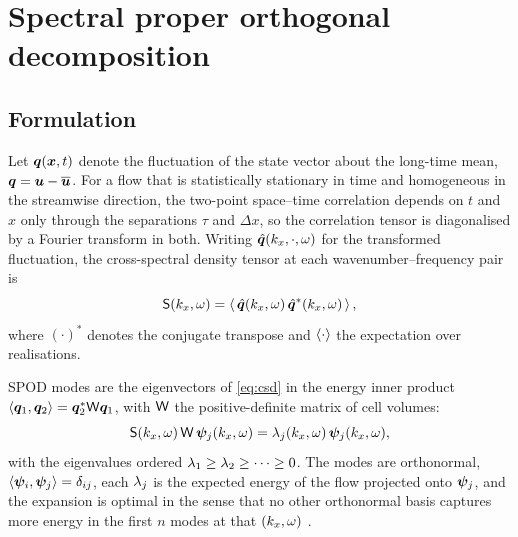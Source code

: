 %
\section{Spectral proper orthogonal decomposition}
\label{sec:spod}

\subsection{Formulation}
\label{sec:spod:formulation}

Let $\bm{q}(\bm{x},t)$ denote the fluctuation of the state vector about the
long-time mean, $\bm{q} = \bm{u} - \overline{\bm{u}}$. For a flow that is
statistically stationary in time and homogeneous in the streamwise direction,
the two-point space--time correlation depends on $t$ and $x$ only through the
separations $\tau$ and $\Delta x$, so the correlation tensor is diagonalised by
a Fourier transform in both. Writing $\hat{\bm{q}}(k_{x},\cdot,\omega)$ for the
transformed fluctuation, the cross-spectral density tensor at each
wavenumber--frequency pair is
\begin{equation}
  \mathsf{S}(k_{x},\omega)
    = \left\langle \, \hat{\bm{q}}(k_{x},\omega)\,\hat{\bm{q}}^{*}(k_{x},\omega) \, \right\rangle ,
  \label{eq:csd}
\end{equation}
where $(\cdot)^{*}$ denotes the conjugate transpose and $\left\langle \cdot \right\rangle$ the
expectation over realisations.

SPOD modes are the eigenvectors of \cref{eq:csd} in the energy inner product
$\left\langle \bm{q}_1 , \bm{q}_2 \right\rangle = \bm{q}_2^{*}\mathsf{W}\bm{q}_1$, with $\mathsf{W}$ the
positive-definite matrix of cell volumes:
\begin{equation}
  \mathsf{S}(k_{x},\omega)\,\mathsf{W}\,\bm{\psi}_j(k_{x},\omega)
    = \lambda_j(k_{x},\omega)\,\bm{\psi}_j(k_{x},\omega) ,
  \label{eq:spod-eig}
\end{equation}
with the eigenvalues ordered $\lambda_1 \ge \lambda_2 \ge \dots \ge 0$.
The modes are orthonormal, $\left\langle \bm{\psi}_i , \bm{\psi}_j \right\rangle = \delta_{ij}$, each
$\lambda_j$ is the expected energy of the flow projected onto $\bm{\psi}_j$, and
the expansion is optimal in the sense that no other orthonormal basis captures
more energy in the first $n$ modes at that $(k_{x},\omega)$
\citep{Lumley1970,Towne2018}.

